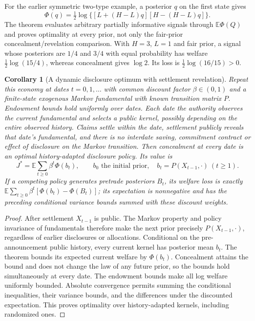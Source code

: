 \documentclass[11pt]{article}
\newtheorem{corollary}[theorem]{Corollary}
\theoremstyle{remark}
\begin{document}
For the earlier symmetric two-type example, a posterior $q$ on the first
state gives
\[
 \Phi(q)=\tfrac12\log\{[L+(H-L)q][H-(H-L)q]\}.
\]
The theorem evaluates arbitrary partially informative signals through
$\mathbb E\Phi(Q)$ and proves optimality at every prior, not only the
fair-prior concealment/revelation comparison. With $H=3$, $L=1$ and fair
prior, a signal whose posteriors are $1/4$ and $3/4$ with equal probability
has welfare $\tfrac12\log(15/4)$, whereas concealment gives $\log2$.
Its loss is $\tfrac12\log(16/15)>0$.

\begin{corollary}[A dynamic disclosure optimum with settlement revelation]
Repeat this economy at dates $t=0,1,\ldots$ with common discount factor
$\beta\in(0,1)$ and a finite-state exogenous Markov fundamental with known
transition matrix $P$. Endowment bounds hold uniformly over dates. Each
date the authority observes the current fundamental and selects a public
kernel, possibly depending on the entire observed history. Claims settle
within the date, settlement publicly reveals that date's fundamental, and
there is no interdate saving, commitment contract or effect of disclosure
on the Markov transition. Then concealment at every date is an optimal
history-adapted disclosure policy. Its value is
\[
 J^*=\mathbb E\sum_{t\geq0}\beta^t\Phi(b_t),
 \qquad b_0\text{ the initial prior},\quad
 b_t=P(X_{t-1},\cdot)\ (t\geq1).
\]
If a competing policy generates pretrade posteriors $B_t$, its welfare
loss is exactly
$\mathbb E\sum_{t\geq0}\beta^t[\Phi(b_t)-\Phi(B_t)]$; its expectation
is nonnegative and has the preceding conditional variance bounds summed
with these discount weights.
\end{corollary}
\begin{proof}
After settlement $X_{t-1}$ is public. The Markov property and policy
invariance of fundamentals therefore make the next prior precisely
$P(X_{t-1},\cdot)$, regardless of earlier disclosures or allocations.
Conditional on the pre-announcement public history, every current kernel
has posterior mean $b_t$. The theorem bounds its expected current welfare
by $\Phi(b_t)$. Concealment attains the bound and does not change the law
of any future prior, so the bounds hold simultaneously at every date.
The endowment bounds make all log welfare uniformly bounded. Absolute
convergence permits summing the conditional inequalities, their variance
bounds, and the differences under the discounted expectation. This proves
optimality over history-adapted kernels, including randomized ones.
\end{proof}
\end{document}
